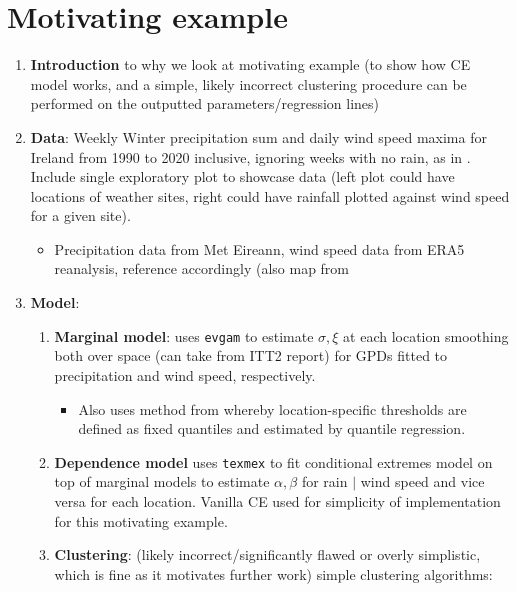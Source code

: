 \documentclass{article}
\numberwithin{equation}{section}
\begin{document}
\section{Motivating example}\label{sec:example}

\begin{enumerate}
  \item \textbf{Introduction} to why we look at motivating example (to show how CE model works, and a simple, likely incorrect clustering procedure can be performed on the outputted parameters/regression lines) 
  \item \textbf{Data}: Weekly Winter precipitation sum and daily wind speed maxima for Ireland from 1990 to 2020 inclusive, ignoring weeks with no rain, as in \cite{Vignotto2021}. Include single exploratory plot to showcase data (left plot could have locations of weather sites, right could have rainfall plotted against wind speed for a given site).
  \begin{itemize}
    \item Precipitation data from Met Eireann, wind speed data from ERA5 reanalysis, reference accordingly (also map from 
  \end{itemize}
  \item \textbf{Model}:
    \begin{enumerate}
      \item \textbf{Marginal model}: uses \texttt{evgam} to estimate $\sigma, \xi$ at each location smoothing both over space (can take from ITT2 report) for GPDs fitted to precipitation and wind speed, respectively.
      \begin{itemize}
        \item Also uses method from \cite{Youngman2019} whereby location-specific thresholds are defined as fixed quantiles and estimated by quantile regression.
      \end{itemize}
      \item \textbf{Dependence model} uses \texttt{texmex} to fit conditional extremes model on top of marginal models to estimate $\alpha, \beta$ for rain $\mid$ wind speed and vice versa for each location. 
        Vanilla CE used for simplicity of implementation for this motivating example. 
      \item \textbf{Clustering}: (likely incorrect/significantly flawed or overly simplistic, which is fine as it motivates further work) simple clustering algorithms:

\end{enumerate}
\end{enumerate}
\end{document}

